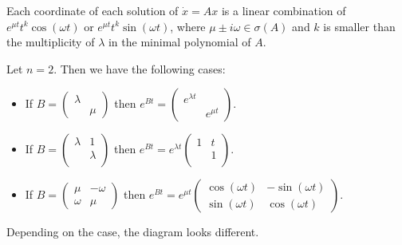 \documentclass{article}
\newcommand*{\mattwo}[4]{\begin{pmatrix}
    #1&#2\\#3&#4
\end{pmatrix}}
\newcommand*{\matutwo}[3]{\begin{pmatrix}
    #1&#2\\ &#3\\
\end{pmatrix}}
\newcommand*{\matdiagtwo}[2]{\mattwo{#1}{\,}{\,}{#2}}
\begin{document}
\begin{cor}
    Each coordinate of each solution of $\dot x = Ax$ is a linear combination of $e^{\mu t}t^k\cos(\omega t)$ or $e^{\mu t}t^k\sin(\omega t)$, where $\mu\pm i \omega \in \sigma(A)$ and $k$ is smaller than the multiplicity of $\lambda$ in the minimal polynomial of $A$.
\end{cor}

Let $n = 2$. Then we have the following cases:
\begin{itemize}
    \item If $B = \matdiagtwo\lambda\mu$ then $e^{Bt} = \matdiagtwo{e^{\lambda t}}{e^{\mu t}}$.

    \item If $B = \matutwo\lambda1\lambda$ then $e^{Bt}=e^{\lambda t}\matutwo1t1$.

    \item If $B = \mattwo\mu{-\omega}\omega\mu$ then $e^{Bt}=e^{\mu t}\mattwo{\cos(\omega t)}{-\sin(\omega t)}{\sin(\omega t)}{\cos(\omega t)}$.
\end{itemize}

Depending on the case, the diagram looks different.
\end{document}
